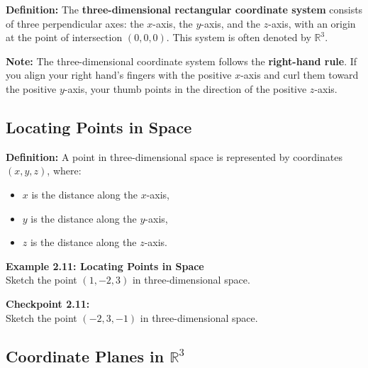 \documentclass{article}
\begin{document}
\begin{definitionbox}
    \textbf{Definition:} The \textbf{three-dimensional rectangular coordinate system} consists of three perpendicular axes: the \(x\)-axis, the \(y\)-axis, and the \(z\)-axis, with an origin at the point of intersection \((0, 0, 0)\). This system is often denoted by \(\mathbb{R}^3\).
\end{definitionbox}

\begin{notebox}
    \textbf{Note:} The three-dimensional coordinate system follows the \textbf{right-hand rule}. If you align your right hand’s fingers with the positive \(x\)-axis and curl them toward the positive \(y\)-axis, your thumb points in the direction of the positive \(z\)-axis.
\end{notebox}

\subsection*{Locating Points in Space}

\begin{definitionbox}
    \textbf{Definition:} A point in three-dimensional space is represented by coordinates \((x, y, z)\), where:
    \begin{itemize}
        \item \(x\) is the distance along the \(x\)-axis,
        \item \(y\) is the distance along the \(y\)-axis,
        \item \(z\) is the distance along the \(z\)-axis.
    \end{itemize}
\end{definitionbox}

\begin{examplebox}
    \textbf{Example 2.11: Locating Points in Space} \\
    Sketch the point \((1, -2, 3)\) in three-dimensional space.
\end{examplebox}

\begin{exercisebox}
    \textbf{Checkpoint 2.11:} \\
    Sketch the point \((-2, 3, -1)\) in three-dimensional space.
\end{exercisebox}

\subsection*{Coordinate Planes in \(\mathbb{R}^3\)}
\end{document}
